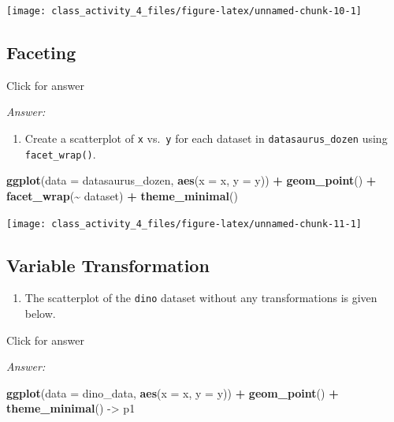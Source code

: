 \documentclass[
]{book}
\newenvironment{Shaded}{\begin{snugshade}}{\end{snugshade}}
\newcommand{\AttributeTok}[1]{\textcolor[rgb]{0.13,0.29,0.53}{#1}}
\newcommand{\FunctionTok}[1]{\textcolor[rgb]{0.13,0.29,0.53}{\textbf{#1}}}
\newcommand{\NormalTok}[1]{#1}
\newcommand{\OtherTok}[1]{\textcolor[rgb]{0.56,0.35,0.01}{#1}}
\newcommand{\SpecialCharTok}[1]{\textcolor[rgb]{0.81,0.36,0.00}{\textbf{#1}}}
\providecommand{\tightlist}{%
  \setlength{\itemsep}{0pt}\setlength{\parskip}{0pt}}
\begin{document}
\texttt{[image: class\_activity\_4\_files/figure-latex/unnamed-chunk-10-1]}

\hypertarget{faceting}{%
\subsection{Faceting}\label{faceting}}

Click for answer

\emph{Answer:}

\begin{enumerate}
\def\labelenumi{\alph{enumi}.}
\tightlist
\item
  Create a scatterplot of \texttt{x} vs.~\texttt{y} for each dataset in \texttt{datasaurus\_dozen} using \texttt{facet\_wrap()}.
\end{enumerate}

\begin{Shaded}
\begin{Highlighting}[]
\FunctionTok{ggplot}\NormalTok{(}\AttributeTok{data =}\NormalTok{ datasaurus\_dozen, }\FunctionTok{aes}\NormalTok{(}\AttributeTok{x =}\NormalTok{ x, }\AttributeTok{y =}\NormalTok{ y)) }\SpecialCharTok{+}
  \FunctionTok{geom\_point}\NormalTok{() }\SpecialCharTok{+}
  \FunctionTok{facet\_wrap}\NormalTok{(}\SpecialCharTok{\textasciitilde{}}\NormalTok{ dataset) }\SpecialCharTok{+}
  \FunctionTok{theme\_minimal}\NormalTok{()}
\end{Highlighting}
\end{Shaded}

\texttt{[image: class\_activity\_4\_files/figure-latex/unnamed-chunk-11-1]}

\hypertarget{variable-transformation}{%
\subsection{Variable Transformation}\label{variable-transformation}}

\begin{enumerate}
\def\labelenumi{\alph{enumi}.}
\tightlist
\item
  The scatterplot of the \texttt{dino} dataset without any transformations is given below.
\end{enumerate}

Click for answer

\emph{Answer:}

\begin{Shaded}
\begin{Highlighting}[]
\FunctionTok{ggplot}\NormalTok{(}\AttributeTok{data =}\NormalTok{ dino\_data, }\FunctionTok{aes}\NormalTok{(}\AttributeTok{x =}\NormalTok{ x, }\AttributeTok{y =}\NormalTok{ y)) }\SpecialCharTok{+}
  \FunctionTok{geom\_point}\NormalTok{() }\SpecialCharTok{+}
  \FunctionTok{theme\_minimal}\NormalTok{() }\OtherTok{{-}\textgreater{}}\NormalTok{ p1}
\end{Highlighting}
\end{Shaded}
\end{document}
